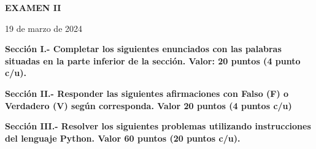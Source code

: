 \documentclass[10pt,addpoints]{exam}
\begin{document}
\begin{center}
  \sffamily\textbf{EXAMEN II}
\end{center}
\begin{flushright}
19 de marzo de 2024
\end{flushright}

\begin{questions}
\begin{EnvFullwidth}
  \sffamily\textbf{Sección I.- Completar los siguientes enunciados con las
  palabras situadas en la parte inferior de la sección. Valor: 20 puntos
  (4 punto c/u).}
\end{EnvFullwidth}








\end{questions}

\begin{questions}
\begin{EnvFullwidth}
  \sffamily\textbf{Sección II.- Responder las siguientes afirmaciones con
  Falso (F) o Verdadero (V) según corres\-ponda. Valor 20 puntos (4 puntos c/u)}
\end{EnvFullwidth}







\end{questions}


%
%
%

\begin{questions}
\begin{EnvFullwidth}
  \sffamily\textbf{Sección III.- Resolver los siguientes problemas utilizando
  instrucciones del lenguaje Python. Valor 60 puntos (20 puntos c/u).}
\end{EnvFullwidth}





\end{questions}
\end{document}
